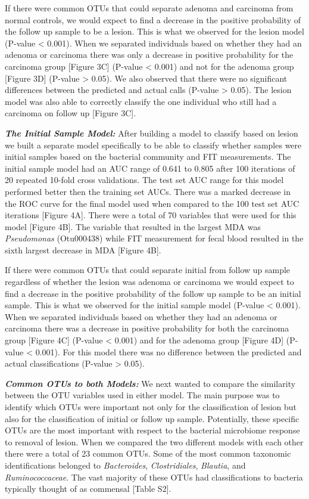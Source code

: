 \documentclass[12pt,]{article}
\begin{document}
If there were common OTUs that could separate adenoma and carcinoma from
normal controls, we would expect to find a decrease in the positive
probability of the follow up sample to be a lesion. This is what we
observed for the lesion model (P-value \textless{} 0.001). When we
separated individuals based on whether they had an adenoma or carcinoma
there was only a decrease in positive probability for the carcinoma
group {[}Figure 3C{]} (P-value \textless{} 0.001) and not for the
adenoma group {[}Figure 3D{]} (P-value \textgreater{} 0.05). We also
observed that there were no significant differences between the
predicted and actual calls (P-value \textgreater{} 0.05). The lesion
model was also able to correctly classify the one individual who still
had a carcinoma on follow up {[}Figure 3C{]}.

\textbf{\emph{The Initial Sample Model:}} After building a model to
classify based on lesion we built a separate model specifically to be
able to classify whether samples were initial samples based on the
bacterial community and FIT measurements. The initial sample model had
an AUC range of 0.641 to 0.805 after 100 iterations of 20 repeated
10-fold cross validations. The test set AUC range for this model
performed better then the training set AUCs. There was a marked decrease
in the ROC curve for the final model used when compared to the 100 test
set AUC iterations {[}Figure 4A{]}. There were a total of 70 variables
that were used for this model {[}Figure 4B{]}. The variable that
resulted in the largest MDA was \emph{Pseudomonas} (Otu000438) while FIT
measurement for fecal blood resulted in the sixth largest decrease in
MDA {[}Figure 4B{]}.

If there were common OTUs that could separate initial from follow up
sample regardless of whether the lesion was adenoma or carcinoma we
would expect to find a decrease in the positive probability of the
follow up sample to be an initial sample. This is what we observed for
the initial sample model (P-value \textless{} 0.001). When we separated
individuals based on whether they had an adenoma or carcinoma there was
a decrease in positive probability for both the carcinoma group
{[}Figure 4C{]} (P-value \textless{} 0.001) and for the adenoma group
{[}Figure 4D{]} (P-value \textless{} 0.001). For this model there was no
difference between the predicted and actual classifications (P-value
\textgreater{} 0.05).

\textbf{\emph{Common OTUs to both Models:}} We next wanted to compare
the similarity between the OTU variables used in either model. The main
purpose was to identify which OTUs were important not only for the
classification of lesion but also for the classification of initial or
follow up sample. Potentially, these specific OTUs are the most
important with respect to the bacterial microbiome response to removal
of lesion. When we compared the two different models with each other
there were a total of 23 common OTUs. Some of the most common taxonomic
identifications belonged to \emph{Bacteroides}, \emph{Clostridiales},
\emph{Blautia}, and \emph{Ruminococcaceae}. The vast majority of these
OTUs had classifications to bacteria typically thought of as commensal
{[}Table S2{]}.
\end{document}
